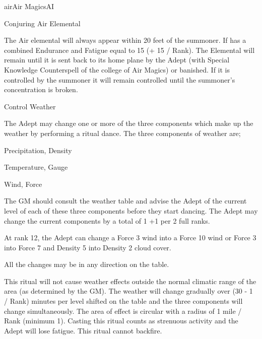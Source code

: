 \begin{college}[2.1]{air}{Air Magics}{AI}
\begin{ritual}[R-2]{Conjuring Air Elemental}
\begin{effects}
The Air elemental will always appear within 20 feet of the summoner.
If has a combined Endurance and Fatigue equal to 15 (+ 15 / Rank).
The Elemental will remain until it is sent back to its home plane by
the Adept (with Special Knowledge Counterspell of the college of Air
Magics) or banished.  If it is controlled by the summoner it will
remain controlled until the summoner's concentration is broken.
\end{effects}
\end{ritual}

\begin{ritual}[R-3]{Control Weather}

\begin{effects}
The Adept may change one or more of the three components which make up
the weather by performing a ritual dance. The three components of
weather are;
\begin{Itemize}
\item Precipitation, Density
\item Temperature, Gauge
\item Wind, Force
\end{Itemize}

The GM should consult the weather table and advise the Adept of the
current level of each of these three components before they start
dancing.  The Adept may change the current components by a total of 1
+1 per 2 full ranks.

\begin{example}
At rank 12, the Adept can change a Force 3 wind into a Force 10 wind
or Force 3 into Force 7 and Density 5 into Density 2 cloud cover.
\end{example}

All the changes may be in any direction on the table.

This ritual will not cause weather effects outside the normal climatic
range of the area (as determined by the GM).  The weather will change
gradually over (30 - 1 / Rank) minutes per level shifted on the table
and the three components will change simultaneously. The area of
effect is circular with a radius of 1 mile / Rank (minimum 1). Casting
this ritual counts as strenuous activity and the Adept will lose
fatigue. This ritual cannot backfire.
\end{effects}
\end{ritual}


\end{college}
